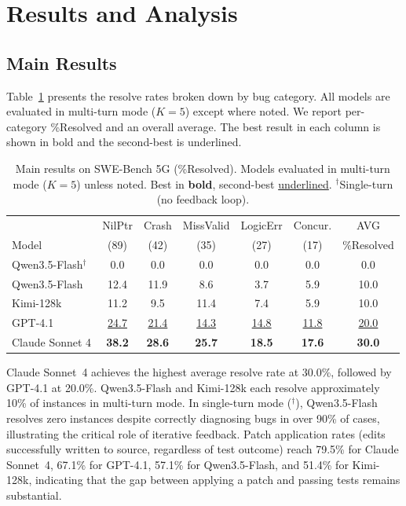 \documentclass[10pt,conference]{IEEEtran}
\begin{document}
\section{Results and Analysis}

\subsection{Main Results}

Table~\ref{tab:main_results} presents the resolve rates broken down by bug category. All models are evaluated in multi-turn mode ($K{=}5$) except where noted. We report per-category \%Resolved and an overall average. The best result in each column is shown in bold and the second-best is underlined.

\begin{table}[t]
\centering
\caption{Main results on SWE-Bench 5G (\%Resolved). Models evaluated in multi-turn mode ($K{=}5$) unless noted. Best in \textbf{bold}, second-best \underline{underlined}. $^\dagger$Single-turn (no feedback loop).}
\label{tab:main_results}
\begin{tabular}{@{}l|ccccc|c@{}}
\toprule
 & NilPtr & Crash & MissValid & LogicErr & Concur. & AVG \\
Model & (89) & (42) & (35) & (27) & (17) & \%Resolved \\
\midrule
Qwen3.5-Flash$^\dagger$ & 0.0 & 0.0 & 0.0 & 0.0 & 0.0 & 0.0 \\
Qwen3.5-Flash & 12.4 & 11.9 & 8.6 & 3.7 & 5.9 & 10.0 \\
Kimi-128k & 11.2 & 9.5 & 11.4 & 7.4 & 5.9 & 10.0 \\
GPT-4.1 & \underline{24.7} & \underline{21.4} & \underline{14.3} & \underline{14.8} & \underline{11.8} & \underline{20.0} \\
Claude Sonnet 4 & \textbf{38.2} & \textbf{28.6} & \textbf{25.7} & \textbf{18.5} & \textbf{17.6} & \textbf{30.0} \\
\bottomrule
\end{tabular}
\end{table}

Claude Sonnet~4 achieves the highest average resolve rate at 30.0\%, followed by GPT-4.1 at 20.0\%. Qwen3.5-Flash and Kimi-128k each resolve approximately 10\% of instances in multi-turn mode. In single-turn mode ($^\dagger$), Qwen3.5-Flash resolves zero instances despite correctly diagnosing bugs in over 90\% of cases, illustrating the critical role of iterative feedback. Patch application rates (edits successfully written to source, regardless of test outcome) reach 79.5\% for Claude Sonnet~4, 67.1\% for GPT-4.1, 57.1\% for Qwen3.5-Flash, and 51.4\% for Kimi-128k, indicating that the gap between applying a patch and passing tests remains substantial.
\end{document}
